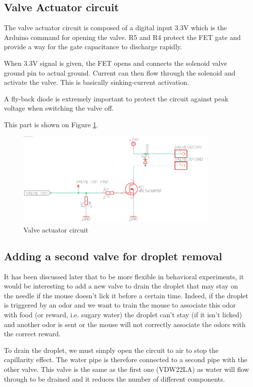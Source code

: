 \documentclass[a4paper]{article}
\begin{document}
\subsection{Valve Actuator circuit}
\label{actuator}
The valve actuator circuit is composed of a digital input 3.3V which is the Arduino command for opening the valve. R5 and R4 protect the FET gate and provide a way for the gate capacitance to discharge rapidly.

When 3.3V signal is given, the FET opens and connects the solenoid valve ground pin to actual ground. Current can then flow through the solenoid and activate the valve. This is basically sinking-current activation.

A fly-back diode is extremely important to protect the circuit against peak voltage when switching the valve off.

This part is shown on Figure \ref{fig:actuator}.

\begin{figure}
    \centering
    \includegraphics[width = 10cm]{images/actuator.PNG}
    \caption{Valve actuator circuit}
    \label{fig:actuator}
\end{figure}

\subsection{Adding a second valve for droplet removal}
It has been discussed later that to be more flexible in behavioral experiments, it would be interesting to add a new valve to drain the droplet that may stay on the needle if the mouse doesn't lick it before a certain time.
Indeed, if the droplet is triggered by an odor and we want to train the mouse to associate this odor with food (or reward, i.e. sugary water) the droplet can't stay (if it isn't licked) and another odor is sent or the mouse will not correctly associate the odors with the correct reward.

To drain the droplet, we must simply open the circuit to air to stop the capillarity effect. The water pipe is therefore connected to a second pipe with the other valve.
This valve is the same as the first one (VDW22LA) as water will flow through to be drained and it reduces the number of different components.
\end{document}
